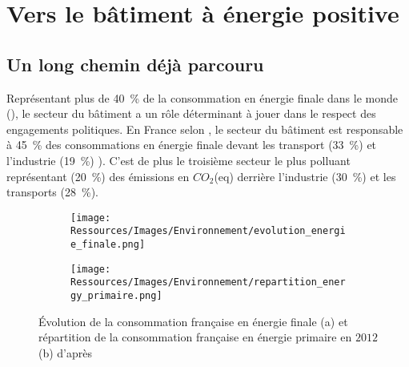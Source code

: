 \section{Vers le bâtiment à énergie positive} %
\label{sec:vers_le_batiment_a_energie_positive}
\subsection{Un long chemin déjà parcouru} %
\label{sub:un_long_chemin_deja_parcouru}
Représentant plus de \SI{40}{\percent} de la consommation en énergie
finale dans le monde (), le secteur du bâtiment a un rôle déterminant à
jouer dans le respect des engagements politiques. En France selon \textcite{ADEME2015}, le secteur du bâtiment
est responsable à \SI{45}{\percent} des consommations en énergie finale devant
les transport (\SI{33}{\percent}) et l’industrie (\SI{19}{\percent}) ).
C’est de plus le troisième secteur le plus polluant représentant (\SI{20}{\percent}) des émissions en $CO_{2}$(eq)
derrière l’industrie (\SI{30}{\percent}) et les transports (\SI{28}{\percent}).


\begin{figure}
    \centering
    \begin{subfigure}{0.45\textwidth}
        \texttt{[image: Ressources/Images/Environnement/evolution\_energie\_finale.png]}
        \caption{}
        \label{fig:evolution_energy_finale}
    \end{subfigure}
    \quad
    \begin{subfigure}{0.45\textwidth}
        \texttt{[image: Ressources/Images/Environnement/repartition\_energy\_primaire.png]}
        \caption{}
        \label{fig:repartition_conso_primaire}
    \end{subfigure}
    \caption[Description du secteur énergétique français]
             {Évolution de la consommation française en énergie finale (a) et
              répartition de la consommation française en énergie primaire en $2012$ (b)
              d’après \textcite{ADEME2015}}
    \label{fig:energy_france}
\end{figure}

